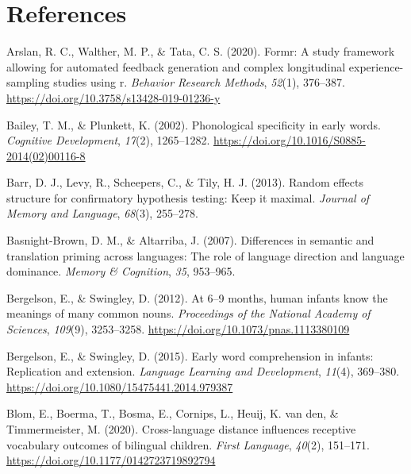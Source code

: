 \documentclass[
]{article}
\newlength{\cslhangindent}
\newlength{\cslentryspacingunit} %
\newenvironment{CSLReferences}[2] %
 {%
  \setlength{\parindent}{0pt}
  \ifodd #1
  \let\oldpar\par
  \def\par{\hangindent=\cslhangindent\oldpar}
  \fi
  \setlength{\parskip}{#2\cslentryspacingunit}
 }%
 {}
\begin{document}
\hypertarget{references}{%
\section*{References}\label{references}}

\hypertarget{refs}{}
\begin{CSLReferences}{1}{0}
\leavevmode{}%
Arslan, R. C., Walther, M. P., \& Tata, C. S. (2020). Formr: A study
framework allowing for automated feedback generation and complex
longitudinal experience-sampling studies using r. \emph{Behavior
Research Methods}, \emph{52}(1), 376--387.
\url{https://doi.org/10.3758/s13428-019-01236-y}

\leavevmode{}%
Bailey, T. M., \& Plunkett, K. (2002). Phonological specificity in early
words. \emph{Cognitive Development}, \emph{17}(2), 1265--1282.
\url{https://doi.org/10.1016/S0885-2014(02)00116-8}

\leavevmode{}%
Barr, D. J., Levy, R., Scheepers, C., \& Tily, H. J. (2013). Random
effects structure for confirmatory hypothesis testing: Keep it maximal.
\emph{Journal of Memory and Language}, \emph{68}(3), 255--278.

\leavevmode{}%
Basnight-Brown, D. M., \& Altarriba, J. (2007). Differences in semantic
and translation priming across languages: The role of language direction
and language dominance. \emph{Memory \& Cognition}, \emph{35}, 953--965.

\leavevmode{}%
Bergelson, E., \& Swingley, D. (2012). At 6--9 months, human infants
know the meanings of many common nouns. \emph{Proceedings of the
National Academy of Sciences}, \emph{109}(9), 3253--3258.
\url{https://doi.org/10.1073/pnas.1113380109}

\leavevmode{}%
Bergelson, E., \& Swingley, D. (2015). Early word comprehension in
infants: Replication and extension. \emph{Language Learning and
Development}, \emph{11}(4), 369--380.
\url{https://doi.org/10.1080/15475441.2014.979387}

\leavevmode{}%
Blom, E., Boerma, T., Bosma, E., Cornips, L., Heuij, K. van den, \&
Timmermeister, M. (2020). Cross-language distance influences receptive
vocabulary outcomes of bilingual children. \emph{First Language},
\emph{40}(2), 151--171. \url{https://doi.org/10.1177/0142723719892794}


\end{CSLReferences}
\end{document}
